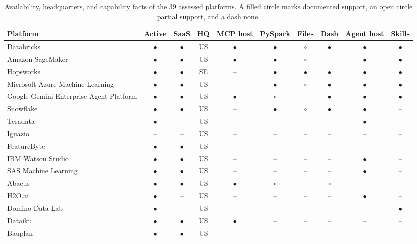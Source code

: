 \begin{table}[p]\centering
\caption[Complete market assessment, platform facts and capabilities]{Availability, headquarters, and capability facts of the 39 assessed platforms. A filled circle marks documented support, an open circle partial support, and a dash none.}
\label{tab:market-facts-full}
{\scriptsize\setlength{\tabcolsep}{3.5pt}
\begin{tabular}{l c c c c c c c c c}
\toprule
Platform & Active & \gls{SaaS} & HQ & \gls{MCP} host & PySpark & Files & Dash & Agent host & Skills \\
\midrule
Databricks & $\bullet$ & $\bullet$ & US & $\bullet$ & $\bullet$ & $\circ$ & $\bullet$ & $\bullet$ & $\bullet$ \\
Amazon SageMaker & $\bullet$ & $\bullet$ & US & $\bullet$ & $\bullet$ & $\circ$ & -- & $\bullet$ & $\bullet$ \\
Hopsworks & $\bullet$ & $\bullet$ & SE & -- & $\bullet$ & $\bullet$ & $\bullet$ & $\bullet$ & $\bullet$ \\
Microsoft Azure Machine Learning & $\bullet$ & $\bullet$ & US & -- & $\bullet$ & $\circ$ & $\bullet$ & $\bullet$ & $\bullet$ \\
Google Gemini Enterprise Agent Platform & $\bullet$ & $\bullet$ & US & $\bullet$ & $\circ$ & -- & $\bullet$ & $\bullet$ & $\bullet$ \\
Snowflake & $\bullet$ & $\bullet$ & US & -- & $\bullet$ & $\circ$ & $\bullet$ & $\bullet$ & -- \\
Teradata & $\bullet$ & -- & US & -- & -- & -- & -- & $\bullet$ & -- \\
Iguazio & -- & -- & US & -- & -- & -- & -- & -- & -- \\
FeatureByte & $\bullet$ & $\bullet$ & US & -- & -- & -- & -- & -- & -- \\
IBM Watson Studio & $\bullet$ & $\bullet$ & US & -- & -- & -- & -- & $\bullet$ & -- \\
SAS Machine Learning & $\bullet$ & $\bullet$ & US & -- & -- & -- & -- & $\bullet$ & -- \\
Abacus & $\bullet$ & $\bullet$ & US & $\bullet$ & $\circ$ & -- & $\circ$ & -- & -- \\
H2O.ai & $\bullet$ & -- & US & -- & -- & -- & -- & $\bullet$ & -- \\
Domino Data Lab & $\bullet$ & -- & US & -- & -- & -- & -- & -- & $\bullet$ \\
Dataiku & $\bullet$ & $\bullet$ & US & $\bullet$ & -- & -- & -- & -- & -- \\
Bauplan & $\bullet$ & $\bullet$ & US & -- & -- & -- & -- & -- & -- \\

\end{tabular}}
\end{table}
